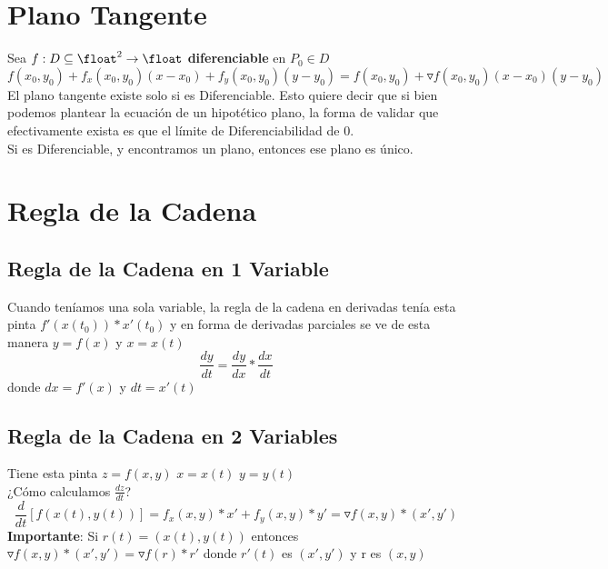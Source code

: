 \documentclass[10pt,a4paper]{article}
\begin{document}
\section*{Plano Tangente}
Sea $f:D \subseteq \float^{2} \rightarrow \float$ \textbf{diferenciable} en $P_{0} \in D$ 
\[f(x_{0}, y_{0}) + f_{x}(x_{0}, y_{0})(x-x_{0})+f_{y}(x_{0}, y_{0})(y-y_{0}) = f(x_{0}, y_{0}) + \triangledown f(x_{0}, y_{0})(x-x_{0})(y-y_{0})\] 
El plano tangente existe solo si es Diferenciable. Esto quiere decir que si bien podemos plantear la ecuación de un hipotético plano, la forma de validar que efectivamente exista es que el límite de Diferenciabilidad de 0. \\
Si es Diferenciable, y encontramos un plano, entonces ese plano es único. 
\section*{Regla de la Cadena}
\subsection*{Regla de la Cadena en 1 Variable}
Cuando teníamos una sola variable, la regla de la cadena en derivadas tenía esta pinta $f'(x(t_{0})) * x'(t_{0})$ y en forma de derivadas parciales se ve de esta manera $y=f(x)$ y $x=x(t)$ 
\[\frac{dy}{dt} = \frac{dy}{dx} * \frac{dx}{dt} \]
donde $dx = f'(x)$ y $dt = x'(t)$ 
\subsection*{Regla de la Cadena en 2 Variables}
Tiene esta pinta $z = f(x,y)$ $x=x(t)$ $y=y(t)$ \\
¿Cómo calculamos $\frac{dz}{dt}$?
\[\frac{d}{dt}[f(x(t), y(t))] = f_{x}(x, y) * x' + f_{y}(x,y) * y' = \triangledown f(x,y) * (x', y')\]
\textbf{Importante}: Si $r(t) = (x(t), y(t))$ entonces $\triangledown f(x,y) * (x', y') = \triangledown f (r) * r'$ donde $r'(t)$ es $(x', y')$ y r es $(x,y)$
\end{document}
